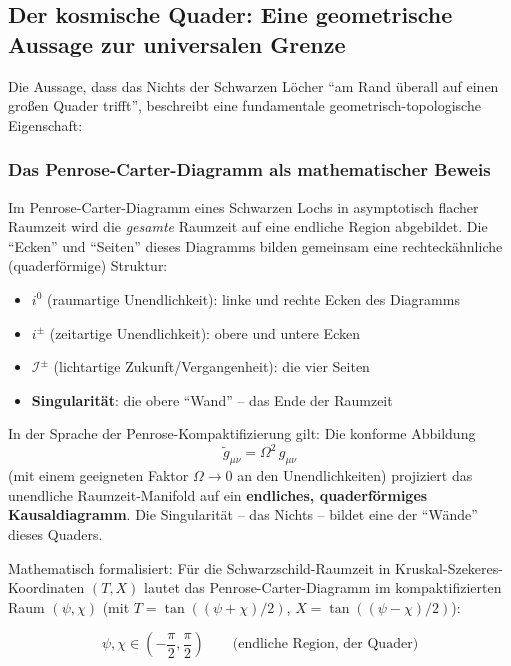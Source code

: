 ﻿\documentclass[12pt,a4paper]{report}
\begin{document}
\subsection{Der kosmische Quader: Eine geometrische Aussage zur universalen Grenze}

Die Aussage, dass das Nichts der Schwarzen Löcher "`am Rand überall auf einen großen Quader trifft"', beschreibt eine fundamentale geometrisch-topologische Eigenschaft:

\subsubsection{Das Penrose-Carter-Diagramm als mathematischer Beweis}

Im Penrose-Carter-Diagramm eines Schwarzen Lochs in asymptotisch flacher Raumzeit wird die \emph{gesamte} Raumzeit auf eine endliche Region abgebildet. Die ``Ecken'' und ``Seiten'' dieses Diagramms bilden gemeinsam eine rechteckähnliche (quaderförmige) Struktur:

\begin{itemize}
    \item \textbf{$i^0$} (raumartige Unendlichkeit): linke und rechte Ecken des Diagramms
    \item \textbf{$i^\pm$} (zeitartige Unendlichkeit): obere und untere Ecken
    \item \textbf{$\mathscr{I}^\pm$} (lichtartige Zukunft/Vergangenheit): die vier Seiten
    \item \textbf{Singularität}: die obere ``Wand'' -- das Ende der Raumzeit
\end{itemize}

In der Sprache der Penrose-Kompaktifizierung gilt: Die konforme Abbildung
\begin{equation}
    \tilde{g}_{\mu\nu} = \Omega^2\, g_{\mu\nu}
    \label{eq:konforme_abbildung}
\end{equation}
(mit einem geeigneten Faktor $\Omega \to 0$ an den Unendlichkeiten) projiziert das unendliche Raumzeit-Manifold auf ein \textbf{endliches, quaderförmiges Kausaldiagramm}. Die Singularität -- das Nichts -- bildet eine der ``Wände'' dieses Quaders.

Mathematisch formalisiert: Für die Schwarzschild-Raumzeit in Kruskal-Szekeres-Koor\-dinaten $(T, X)$ lautet das Penrose-Carter-Diagramm im kompaktifizierten Raum $(\psi, \chi)$ (mit $T = \tan((\psi+\chi)/2)$, $X = \tan((\psi-\chi)/2)$):

\begin{equation}
    \psi, \chi \in \left(-\frac{\pi}{2}, \frac{\pi}{2}\right) \qquad \text{(endliche Region, der Quader)}
    \label{eq:penrose_kompakt}
\end{equation}
\end{document}
